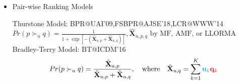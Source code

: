 \documentclass[a0paper,portrait]{baposter}
\newcommand{\Rating}{\mathbf{X}}
\begin{document}
\begin{poster}
{\begin{itemize}

 AMF@KDD'08: \quad
$\hat{\Rating}_{u,q}=\sum_{k=1}^{K} \textcolor{cyan}{ (\sum_{\mathbf{p} \in R(u)} \mathbf{p}_k/\sqrt{|R(u)|} )} \textcolor{red}{\mathbf{q}_{k}} $

 LLORMA@JMLR'16:\quad
\begin{equation*}
\hat{\Rating}_{u,q}
= \sum_{t=1}^{S} \sum_{k=1}^K \textcolor{cyan}{\mathbf{u}_{t, k} \frac{K((\mathbf{u}_t,\mathbf{i}_t),(\mathbf{u},\mathbf{q}))}{\sum_{s=1}^{S} K((\mathbf{u}_s,\mathbf{i}_s),(\mathbf{u},\mathbf{q}))}}\textcolor{red}{ \mathbf{q}_{t,k}}
\end{equation*}



\item Pair-wise Ranking Models

Thurstone Model: BPR@UAI'09,FSBPR@AJSE'18,LCR@WWW'14\\

$Pr(p\succ_u q) = \frac{1} {1+\exp[-(\hat{\Rating}_{u,p}+\hat{\Rating}_{u,q})]},\hat{\Rating}_{u,p,q}\textrm{ by MF, AMF, or LLORMA}$\\

Bradley-Terry Model: BT@ICDM'16
\begin{equation*}
Pr(p\succ_u q) = \frac{{\hat{\Rating}_{u,p}}}{{\hat{\Rating}_{u,p}}+ {\hat{\Rating}_{u,q}}} , \quad \textrm{where}\quad  \hat{\mathbf{X}}_{u,q}=\sum_{k=1}^{K} \textcolor{cyan}{\mathbf{u}_k}\textcolor{red}{\mathbf{q}_k}
\end{equation*}



\end{itemize}}
\end{poster}
\end{document}
